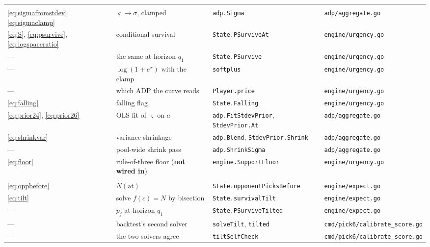 \documentclass[10pt,a4paper]{article}
\theoremstyle{plain}
\theoremstyle{definition}
\theoremstyle{remark}
\newcommand{\code}[1]{\texttt{\small #1}}
\begin{document}
\begin{longtable}{@{}p{}p{}p{}p{}@{}}
\addlinespace
\multicolumn{4}{@{}l}{\emph{Survival}}\\[0.2em]
\eqref{eq:sigmafromstdev}, \eqref{eq:sigmaclamp} & $\varsigma \to \sigma$, clamped & \code{adp.Sigma} & \code{adp/aggregate.go} \\
\eqref{eq:S}, \eqref{eq:psurvive}, \eqref{eq:logspaceratio} & conditional survival & \code{State.PSurviveAt} & \code{engine/urgency.go} \\
--- & the same at horizon $q_1$ & \code{State.PSurvive} & \code{engine/urgency.go} \\
--- & $\log(1+e^x)$ with the clamp & \code{softplus} & \code{engine/urgency.go} \\
--- & which ADP the curve reads & \code{Player.price} & \code{engine/urgency.go} \\
\eqref{eq:falling} & falling flag & \code{State.Falling} & \code{engine/urgency.go} \\
\eqref{eq:prior24}, \eqref{eq:prior26} & OLS fit of $\varsigma$ on $a$ & \code{adp.FitStdevPrior}, \code{StdevPrior.At} & \code{adp/aggregate.go} \\
\eqref{eq:shrinkvar} & variance shrinkage & \code{adp.Blend}, \code{StdevPrior.Shrink} & \code{adp/aggregate.go} \\
--- & pool-wide shrink pass & \code{adp.ShrinkSigma} & \code{adp/aggregate.go} \\
\eqref{eq:floor} & rule-of-three floor (\textbf{not wired in}) & \code{engine.SupportFloor} & \code{engine/urgency.go} \\

\addlinespace
\multicolumn{4}{@{}l}{\emph{The tilt}}\\[0.2em]
\eqref{eq:oppbefore} & $N(\text{at})$ & \code{State.opponentPicksBefore} & \code{engine/expect.go} \\
\eqref{eq:tilt} & solve $f(c) = N$ by bisection & \code{State.survivalTilt} & \code{engine/expect.go} \\
--- & $\tilde p_j$ at horizon $q_1$ & \code{State.PSurviveTilted} & \code{engine/expect.go} \\
--- & backtest's second solver & \code{solveTilt}, \code{tilted} & \code{cmd/pick6/calibrate\_score.go} \\
--- & the two solvers agree & \code{tiltSelfCheck} & \code{cmd/pick6/calibrate\_score.go} \\


\end{longtable}
\end{document}
